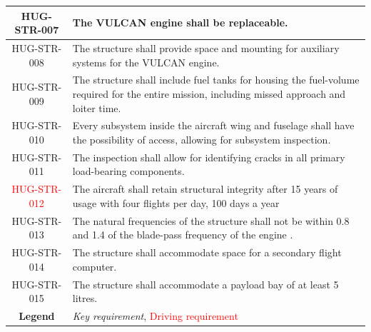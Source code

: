 \begin{longtable}{|c|p{13cm}|}
HUG-STR-007& The VULCAN engine shall be replaceable. \\ \hline

HUG-STR-008& The structure shall provide space and mounting for auxiliary systems for the VULCAN engine. \\ \hline

HUG-STR-009& The structure shall include fuel tanks for housing the fuel-volume required for the entire mission, including missed approach and loiter time. \\ \hline

HUG-STR-010 & Every subsystem inside the aircraft wing and fuselage shall have the possibility of access, allowing for subsystem inspection. \\ \hline  

HUG-STR-011 & The inspection shall allow for identifying cracks in all primary load-bearing components. \\ \hline  

\textcolor{red}{HUG-STR-012}&  The aircraft shall retain structural integrity after 15 years of usage with four flights per day, 100 days a year \\ \hline

HUG-STR-013& The natural frequencies of the structure shall not be within 0.8 and 1.4 \cite{Prakash2016DynamicFoundation} of the blade-pass frequency of the engine \cite{Alhazmi2025CoolingFanVibration}. \\ \hline


HUG-STR-014 & The structure shall accommodate space for a secondary flight computer. \\ \hline

HUG-STR-015 & The structure shall accommodate a payload bay of at least 5 litres. \\ \hline

\textbf{Legend} & \textit{Key requirement}, \textcolor{red}{Driving requirement} \\
\hline

\end{longtable}






